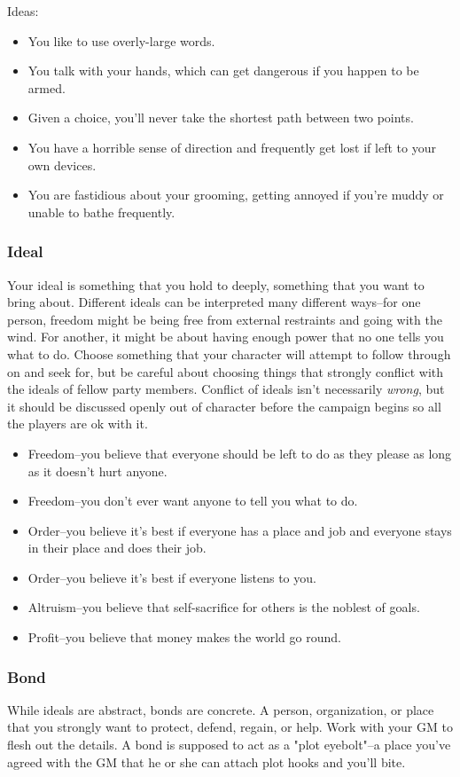 Ideas:
\begin{itemize}
	\item You like to use overly-large words.
	\item You talk with your hands, which can get dangerous if you happen to be armed.
	\item Given a choice, you'll never take the shortest path between two points.
	\item You have a horrible sense of direction and frequently get lost if left to your own devices.
	\item You are fastidious about your grooming, getting annoyed if you're muddy or unable to bathe frequently.
\end{itemize}

\subsubsection{Ideal}
Your ideal is something that you hold to deeply, something that you want to bring about. Different ideals can be interpreted many different ways--for one person, freedom might be being free from external restraints and going with the wind. For another, it might be about having enough power that no one tells you what to do. Choose something that your character will attempt to follow through on and seek for, but be careful about choosing things that strongly conflict with the ideals of fellow party members. Conflict of ideals isn't necessarily \textit{wrong}, but it should be discussed openly out of character before the campaign begins so all the players are ok with it.

\begin{itemize}
	\item Freedom--you believe that everyone should be left to do as they please as long as it doesn't hurt anyone.
	\item Freedom--you don't ever want anyone to tell you what to do.
	\item Order--you believe it's best if everyone has a place and job and everyone stays in their place and does their job.
	\item Order--you believe it's best if everyone listens to you.
	\item Altruism--you believe that self-sacrifice for others is the noblest of goals.
	\item Profit--you believe that money makes the world go round.
\end{itemize}

\subsubsection{Bond}
While ideals are abstract, bonds are concrete. A person, organization, or place that you strongly want to protect, defend, regain, or help. Work with your GM to flesh out the details. A bond is supposed to act as a "plot eyebolt"--a place you've agreed with the GM that he or she can attach plot hooks and you'll bite.

